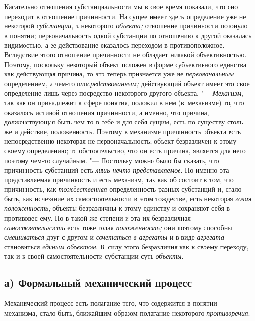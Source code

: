 Касательно отношения субстанциальности мы в свое время
показали, что оно переходит в отношение причинности. На сущее имеет здесь
определение уже не некоторой {\em субстанции}, a некоторого {\em объекта;}
отношение причинности потонуло в понятии; первоначальность
одной субстанции по отношению к другой оказалась видимостью, а ее
действование оказалось переходом в противоположное. Вследствие этого
отношение причинности не обладает никакой объективностью. Поэтому,
поскольку некоторый объект положен в форме субъективного единства как
действующая причина, то это теперь признается уже не {\em первоначальным}
определением, а чем-то {\em опосредствованным;}
действующий объект имеет это свое определение лишь через
посредство некоторого другого объекта. "--- {\em Механизм}, так как он
принадлежит к сфере понятия, положил в нем (в~механизме) то, что оказалось
истиной отношения причинности, а именно, что причина, долженствующая быть
чем-то в-себе-и-для-себя-сущим, есть по существу столь же и действие,
положенность. Поэтому в механизме причинность объекта есть непосредственно
некоторая не-первоначальность; объект безразличен к этому своему
определению; то обстоятельство, что он есть причина, является для него
поэтому чем-то случайным. "--- Постольку можно было бы сказать,
что причинность субстанций есть {\em лишь нечто представляемое}.
Но именно эта представляемая причинность и есть механизм, так
как об состоит в том, что причинность, как {\em тождественная}
определенность разных субстанций и, стало быть, как исчезание
их самостоятельности в этом тождестве, есть некоторая {\em голая положенность;}
объекты безразличны к этому единству и сохраняют себя в
противовес ему. Но в такой же степени и эта их безразличная
{\em самостоятельность} есть тоже голая {\em положенность;} они
поэтому способны {\em смешиваться} друг с другом и {\em сочетаться в агрегаты}
и в виде {\em агрегата} становиться {\em единым
объектом}. В~силу этого безразличия как к своему переходу,
так и к своей самостоятельности субстанции суть {\em объекты}.

\subsection[а) Формальный механический процесс]{а) Формальный механический процесс}
Механический процесс есть полагание того, что содержится в понятии механизма,
стало быть, ближайшим образом полагание некоторого {\em противоречия}.


